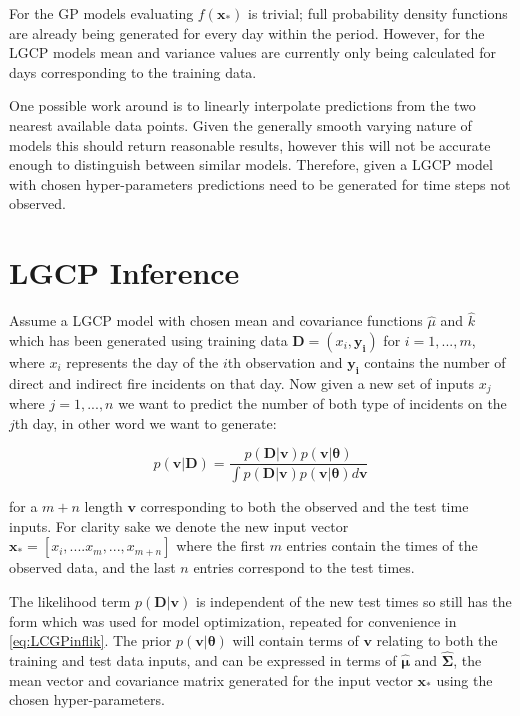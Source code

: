 \documentclass[a4paper,11pt]{report}
\begin{document}
For the GP models evaluating \(f(\mathbf{x_*})\) is trivial; full probability density functions are already being generated for every day within the period. However, for the LGCP models mean and variance values are currently only being calculated for days corresponding to the training data. \par

One possible work around is to linearly interpolate predictions from the two nearest available data points. Given the generally smooth varying nature of models this should return reasonable results, however this will not be accurate enough to distinguish between similar models. Therefore, given a LGCP model with chosen hyper-parameters predictions need to be generated for time steps not observed.

\section{LGCP Inference}

Assume a LGCP model with chosen mean and covariance functions \(\hat{\mu}\) and \(\hat{k}\) which has been generated using training data \(\mathbf{D} = (x_i,\mathbf{y_i})\) for  \(i = 1,...,m\), where \(x_i\) represents the day of the \(i\)th observation and \(\mathbf{y_i}\) contains the number of direct and indirect fire incidents on that day. Now given a new set of inputs \(x_j\) where \(j = 1,...,n\) we want to predict the number of both type of incidents on the \(j\)th day, in other word we want to generate:

\begin{equation}
p(\mathbf{v | D}) = \frac{p(\mathbf{D|v})p(\mathbf{v}|\boldsymbol{\theta}) }{\int{p(\mathbf{D|v})p(\mathbf{v}|\boldsymbol{\theta}) d\mathbf{v}}}\end{equation}

for a \(m+n\) length \(\mathbf{v}\) corresponding to both the observed and the test time inputs. For clarity sake we denote the new input vector \(\mathbf{x_*} = [x_i,....x_m,...,x_{m+n}]\) where the first \(m\) entries contain the times of the observed data, and the last \(n\) entries correspond to the test times. \par

The likelihood term \(p(\mathbf{D|v})\) is independent of the new test times so still has the form which was used for model optimization, repeated for convenience in \ref{eq:LCGPinflik}. The prior \(p(\mathbf{v}|\boldsymbol{\theta})\) will contain terms of \(\mathbf{v}\) relating to both the training and test data inputs, and can be expressed in terms of \(\hat{\boldsymbol{\mu}}\) and \(\hat{\boldsymbol{\Sigma}}\), the mean vector and covariance matrix generated for the input vector \(\mathbf{x_*}\) using the chosen hyper-parameters.
\end{document}
